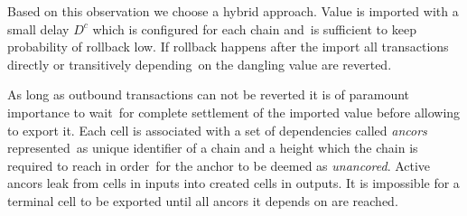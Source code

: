 Based on this observation we choose a hybrid approach.
Value is imported with a small delay $D^c$ which is configured for each chain and\
is sufficient to keep probability of rollback low.
If rollback happens after the import all transactions directly or transitively depending\
on the dangling value are reverted.

As long as outbound transactions can not be reverted it is of paramount importance to wait\
for complete settlement of the imported value before allowing to export it.
Each cell is associated with a set of dependencies called \emph{ancors} represented\
as unique identifier of a chain and a height which the chain is required to reach in order\
for the anchor to be deemed as \emph{unancored}.
Active ancors leak from cells in inputs into created cells in outputs.
It is impossible for a terminal cell to be exported until all ancors it depends on are reached.
